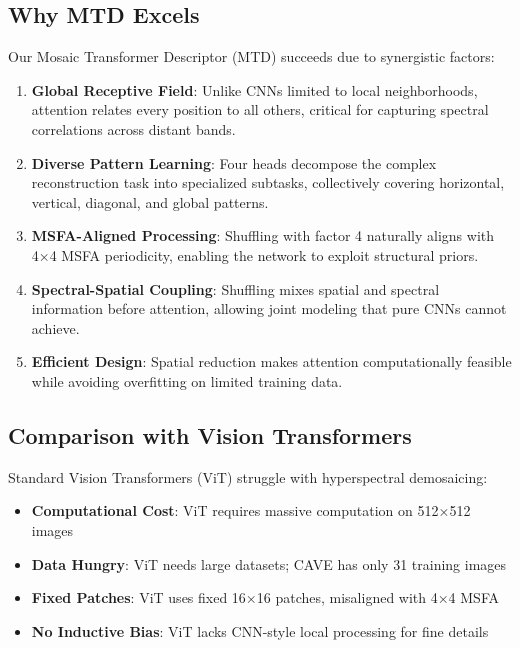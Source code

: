 \documentclass[conference]{IEEEtran}
\begin{document}
\subsection{Why MTD Excels}

Our Mosaic Transformer Descriptor (MTD) succeeds due to synergistic factors:

\begin{enumerate}
    \item \textbf{Global Receptive Field}: Unlike CNNs limited to local neighborhoods, attention relates every position to all others, critical for capturing spectral correlations across distant bands.
    
    \item \textbf{Diverse Pattern Learning}: Four heads decompose the complex reconstruction task into specialized subtasks, collectively covering horizontal, vertical, diagonal, and global patterns.
    
    \item \textbf{MSFA-Aligned Processing}: Shuffling with factor 4 naturally aligns with 4×4 MSFA periodicity, enabling the network to exploit structural priors.
    
    \item \textbf{Spectral-Spatial Coupling}: Shuffling mixes spatial and spectral information before attention, allowing joint modeling that pure CNNs cannot achieve.
    
    \item \textbf{Efficient Design}: Spatial reduction makes attention computationally feasible while avoiding overfitting on limited training data.
\end{enumerate}

\subsection{Comparison with Vision Transformers}

Standard Vision Transformers (ViT) \cite{b6} struggle with hyperspectral demosaicing:

\begin{itemize}
    \item \textbf{Computational Cost}: ViT requires massive computation on 512×512 images
    \item \textbf{Data Hungry}: ViT needs large datasets; CAVE has only 31 training images
    \item \textbf{Fixed Patches}: ViT uses fixed 16×16 patches, misaligned with 4×4 MSFA
    \item \textbf{No Inductive Bias}: ViT lacks CNN-style local processing for fine details
\end{itemize}
\end{document}

